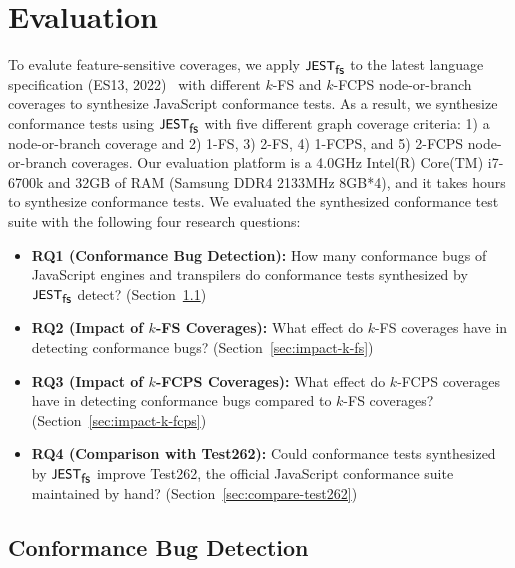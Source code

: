 \section{Evaluation}\label{sec:eval}

To evalute feature-sensitive coverages, we apply $\textsf{\small JEST}_{\textsf{\small fs}}$ to the latest language
specification (ES13, 2022)~\cite{es13} with different $k$-FS and $k$-FCPS
node-or-branch coverages to synthesize JavaScript conformance tests.
%
As a result, we synthesize  conformance tests using $\textsf{\small JEST}_{\textsf{\small fs}}$ with
five different graph coverage criteria: 1) a node-or-branch coverage and 2)
1-FS, 3) 2-FS, 4) 1-FCPS, and 5) 2-FCPS node-or-branch coverages.
%
Our evaluation platform is a 4.0GHz Intel(R) Core(TM) i7-6700k and 32GB of RAM
(Samsung DDR4 2133MHz 8GB*4), and it takes  hours to synthesize
conformance tests.
%
We evaluated the synthesized conformance test suite with the following four
research questions:
\begin{itemize}
  \item \textbf{RQ1 (Conformance Bug Detection):} How many conformance bugs of
    JavaScript engines and transpilers do conformance tests synthesized by
    $\textsf{\small JEST}_{\textsf{\small fs}}$ detect? (Section~\ref{sec:conform-bug})
  \item \textbf{RQ2 (Impact of $k$-FS Coverages):} What effect do $k$-FS
    coverages have in detecting conformance bugs?
    (Section~\ref{sec:impact-k-fs})
  \item \textbf{RQ3 (Impact of $k$-FCPS Coverages):} What effect do $k$-FCPS
    coverages have in detecting conformance bugs compared to $k$-FS coverages?
    (Section~\ref{sec:impact-k-fcps})
  \item \textbf{RQ4 (Comparison with Test262):} Could conformance tests
    synthesized by $\textsf{\small JEST}_{\textsf{\small fs}}$ improve Test262, the official JavaScript conformance
    suite maintained by hand? (Section~\ref{sec:compare-test262})
\end{itemize}


\subsection{Conformance Bug Detection}\label{sec:conform-bug}

